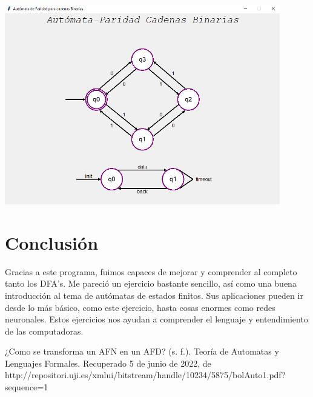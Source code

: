 \documentclass{article}
\begin{document}
\begin{center}
    \newline\newline
    \includegraphics[width = 12cm]{graphic.PNG}
\end{center}
\newpage

\section{Conclusión}
Gracias a este programa, fuimos capaces de mejorar y comprender al completo tanto los DFA's. Me pareció un ejercicio bastante sencillo, así como una buena introducción al tema de autómatas de estados finitos. Sus aplicaciones pueden ir desde lo más básico, como este ejercicio, hasta cosas enormes como redes neuronales. Estos ejercicios nos ayudan a comprender el lenguaje y entendimiento de las computadoras.

\begin{thebibliography}{}
    \bibitem
    ¿Como se transforma un AFN en un AFD? (s. f.). Teoría de Automatas y Lenguajes Formales. Recuperado 5 de junio de 2022, de http://repositori.uji.es/xmlui/bitstream/handle/10234/5875/bolAuto1.pdf?sequence=1
    
    
\end{thebibliography}
\end{document}
